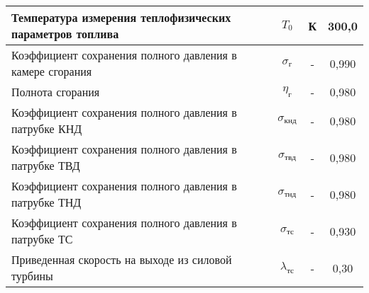 \begin{center}
\begin{longtable}{|p{7cm}|c|c|c|}
		Температура измерения теплофизических параметров топлива & $T_0$ & К & 300,0 \\ \hline
		Коэффициент сохранения полного давления в камере сгорания & $\sigma_{г}$ & - & 0,990 \\ \hline
		Полнота сгорания & $\eta_{г}$ & - & 0,980 \\ \hline
		Коэффициент сохранения полного давления в патрубке КНД & $\sigma_{кнд}$ & - & 0,980 \\ \hline
		Коэффициент сохранения полного давления в патрубке ТВД & $\sigma_{твд}$ & - & 0,980 \\ \hline
		Коэффициент сохранения полного давления в патрубке ТНД & $\sigma_{тнд}$ & - & 0,980 \\ \hline
		Коэффициент сохранения полного давления в патрубке ТС & $\sigma_{тс}$ & - & 0,930 \\ \hline
		Приведенная скорость на выходе из силовой турбины & $\lambda_{тс}$ & - & 0,30 \\ \hline
	\end{longtable}
\end{center}

%